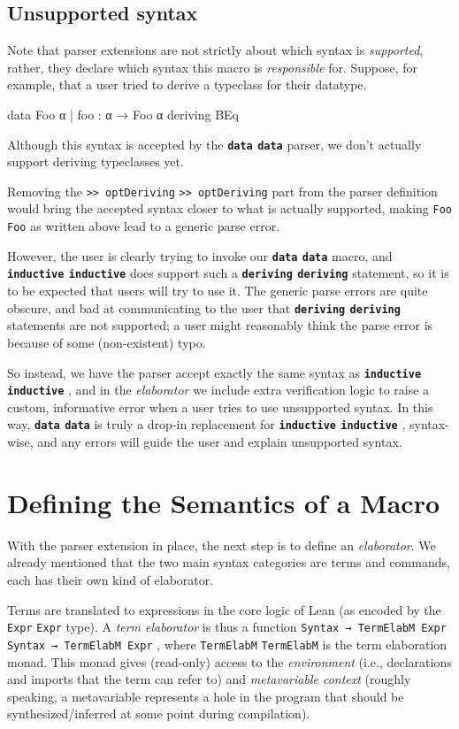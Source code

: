 \documentclass[titlepage]{report}
\newcommand\lean[1]{%
\ifx\leanmode\undefined%
\def\leanmode{1}%
\texttt{\small #1}%
\undef\leanmode%
\else%
\texttt{#1}%
\fi%
}
\newcommand\keyword[1]{{\color{keywordcolor} \textbf{\lean{#1}}}}
\newcommand\inductive{{\keyword{inductive}}}
\newcommand\data{\keyword{data}}
\begin{document}
\subsection{Unsupported syntax}
Note that parser extensions are not strictly about which syntax is \emph{supported}, rather, they declare which syntax this macro is \emph{responsible} for.
Suppose, for example, that a user tried to derive a typeclass for their datatype.
\begin{badleancode}
    data Foo α
      | foo : α → Foo α
      deriving BEq
\end{badleancode}

Although this syntax is accepted by the \data{} parser, we don't actually support deriving typeclasses yet.

Removing the \lean{>> optDeriving} part from the parser definition would bring the accepted syntax closer to what is actually supported, making \lean{Foo} as written above lead to a generic parse error.

However, the user is clearly trying to invoke our \data{} macro, and \inductive{} does support such a \keyword{deriving} statement, so it is to be expected that users will try to use it. The generic parse errors are quite obscure, and bad at communicating to the user that \keyword{deriving} statements are not supported; a user might reasonably think the parse error is because of some (non-existent) typo.

So instead, we have the parser accept exactly the same syntax as \inductive{}, and in the \emph{elaborator} we include extra verification logic to raise a custom, informative error when a user tries to use unsupported syntax.
In this way, \data{} is truly a drop-in replacement for \inductive{}, syntax-wise, and any errors will guide the user and explain unsupported syntax.



\section{Defining the Semantics of a Macro}
With the parser extension in place, the next step is to define an \emph{elaborator}.
We already mentioned that the two main syntax categories are terms and commands, each has their own kind of elaborator.

Terms are translated to expressions in the core logic of Lean (as encoded by the \lean{Expr} type). A \emph{term elaborator} is thus a function \lean{Syntax → TermElabM Expr}, where \lean{TermElabM} is the term elaboration monad. This monad gives (read-only) access to the \emph{environment} (i.e., declarations and imports that the term can refer to) and \emph{metavariable context} (roughly speaking, a metavariable represents a hole in the program that should be synthesized/inferred at some point during compilation).
\end{document}
